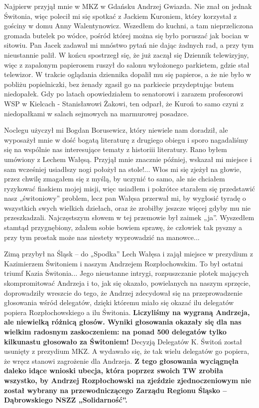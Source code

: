 Najpierw przyjął mnie w MKZ w Gdańsku Andrzej Gwiazda. Nie znał on jednak Świtonia, więc polecił mi się spotkać z Jackiem Kuroniem, który korzystał z gościny w domu Anny Walentynowicz. Wszedłem do kuchni, a tam nieprzeliczona gromada butelek po wódce, pośród której można się było poruszać jak bocian w sitowiu. Pan Jacek zadawał mi mnóstwo pytań nie dając żadnych rad, a przy tym nieustannie palił. W końcu spostrzegł się, że już zaczął się Dziennik telewizyjny, więc z zapalonym papierosem ruszył do salonu wyłożonego parkietem, gdzie stał telewizor. W trakcie oglądania dziennika dopalił mu się papieros, a że nie było w pobliżu popielniczki, bez żenady zgasił go na parkiecie przydeptując butem niedopałek. Gdy po latach opowiedziałem to senatorowi i zarazem profesorowi WSP w Kielcach - Stanisławowi Żakowi, ten odparł, że Kuroń to samo czyni z niedopałkami w salach sejmowych na marmurowej posadzce.

Noclegu użyczył mi Bogdan Borusewicz, który niewiele nam doradził, ale wyposażył  mnie w dość bogatą literaturę z drugiego obiegu i sporo nagadaliśmy się na wspólnie nas interesujące tematy z historiii literatury. Rano byłem umówiony z Lechem Wałęsą. Przyjął mnie znacznie później, wskazał mi miejsce i sam wcześniej usiadłszy  nogi położył na stole!... Włos mi się zjeżył na głowie, przez chwilę zmagałem się z myślą, by uczynić to samo, ale nie chciałem ryzykować fiaskiem mojej misji, więc usiadłem i pokrótce starałem się przedstawić nasz „świtoniowy” problem, lecz pan Wałęsa przerwał mi, by wygłosić tyradę o wszystkich swych wielkich dziełach, oraz że zrobiłby jeszcze więcej gdyby mu nie przeszkadzali. Najczęstszym słowem w tej przemowie był zaimek „ja”. Wyszedłem stamtąd przygnębiony, zdałem sobie bowiem sprawę, że człowiek tak pyszny a przy tym prostak może nas niestety wyprowadzić na manowce...

Zimą przybył na Śląsk – do „Spodka” Lech Wałęsa i zajął miejsce w prezydium z Kazimierzem Świtoniem i naszym Andrzejem Rozpłochowskim. To był ostatni triumf Kazia Świtonia... Jego nieustanne intrygi, rozpuszczanie plotek mających skompromitować Andrzeja i to, jak się okazało, powielanych na naszym sprzęcie, doprowadziły wreszcie do tego, że Andrzej zdecydował się na przeprowadzenie głosowania wśród delegatów, dzięki któremu miało się okazać ilu delegatów popiera Rozpłochowskiego a ilu Świtonia. \textbf{Liczyliśmy na wygraną Andrzeja, ale niewielką różnicą głosów. Wyniki głosowania okazały się dla nas wielkim radosnym zaskoczeniem: na ponad 500 delegatów tylko kilkunastu głosowało za Świtoniem!} Decyzją Delegatów K. Świtoń został usunięty z prezydium MKZ. A wydawało się, że tak wielu delegatów go popiera, że wręcz stanowi zagrożenie dla Andrzeja. \textbf{Z tego głosowania wyciągnęła daleko idące wnioski ubecja, która poprzez swoich TW zrobiła wszystko, by Andrzej Rozpłochowski na zjeździe zjednoczeniowym nie został wybrany na przewodniczącego Zarządu Regionu Śląsko – Dąbrowskiego NSZZ „Solidarność”.}

